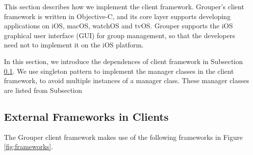 \documentclass[a4paper,11pt]{report}
\begin{document}
This section describes how we implement the client framework.
Grouper's client framework is written in Objective-C, and its core layer supports developing applications on iOS, macOS, watchOS and tvOS.
Grouper supports the iOS graphical user interface (GUI) for group management, so that the developers need not to implement it on the iOS platform.

In this section, we introduce the dependences of client framework in Subsection \ref{subsection:dependencies_client}.
We use singleton pattern to implement the manager classes in the client framework, to avoid multiple instances of a manager class.
These manager classes are listed from Subsection 

\subsection{External Frameworks in Clients} \label{subsection:dependencies_client}

The Grouper client framework makes use of the following frameworks in Figure \ref{fig:frameworks}.
\end{document}
